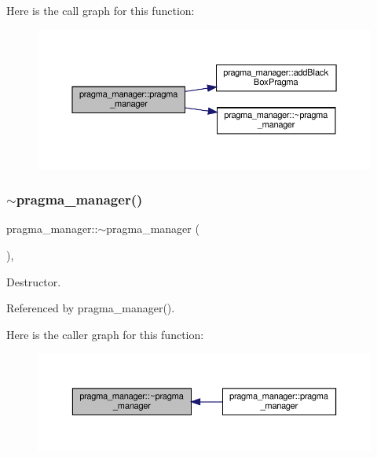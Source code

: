 Here is the call graph for this function\+:
\nopagebreak
\begin{figure}[H]
\begin{center}
\leavevmode
\includegraphics[width=350pt]{d2/d1d/classpragma__manager_abe4b519b37e161145fdc9b7f3eec8dc7_cgraph}
\end{center}
\end{figure}
\mbox{\label{classpragma__manager_a33e658c5da1d379d7a8a83263c9179c6}} 
\subsubsection{\texorpdfstring{$\sim$pragma\+\_\+manager()}{~pragma\_manager()}}
{\footnotesize\ttfamily pragma\+\_\+manager\+::$\sim$pragma\+\_\+manager (\begin{DoxyParamCaption}{ }\end{DoxyParamCaption})\hspace{0.3cm}{\ttfamily [virtual]}, {\ttfamily [default]}}



Destructor. 



Referenced by pragma\+\_\+manager().

Here is the caller graph for this function\+:
\nopagebreak
\begin{figure}[H]
\begin{center}
\leavevmode
\includegraphics[width=350pt]{d2/d1d/classpragma__manager_a33e658c5da1d379d7a8a83263c9179c6_icgraph}
\end{center}
\end{figure}


